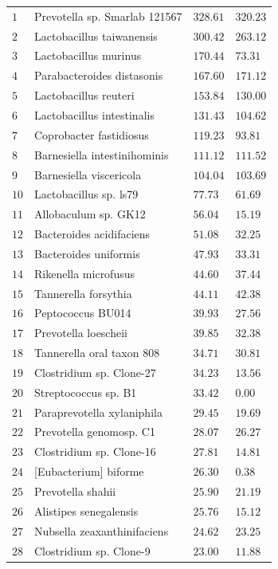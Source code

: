 \begin{center}
\begin{longtable}{|l|l|l|l|}
\hline \hline
\endlastfoot
$1$ & Prevotella sp. Smarlab 121567 & $328.61$ & $320.23$ \\
$2$ & Lactobacillus taiwanensis & $300.42$ & $263.12$ \\
$3$ & Lactobacillus murinus & $170.44$ & $73.31$ \\
$4$ & Parabacteroides distasonis & $167.60$ & $171.12$ \\
$5$ & Lactobacillus reuteri & $153.84$ & $130.00$ \\
$6$ & Lactobacillus intestinalis & $131.43$ & $104.62$ \\
$7$ & Coprobacter fastidiosus & $119.23$ & $93.81$ \\
$8$ & Barnesiella intestinihominis & $111.12$ & $111.52$ \\
$9$ & Barnesiella viscericola & $104.04$ & $103.69$ \\
$10$ & Lactobacillus sp. ls79 & $77.73$ & $61.69$ \\
$11$ & Allobaculum sp. GK12 & $56.04$ & $15.19$ \\
$12$ & Bacteroides acidifaciens & $51.08$ & $32.25$ \\
$13$ & Bacteroides uniformis & $47.93$ & $33.31$ \\
$14$ & Rikenella microfusus & $44.60$ & $37.44$ \\
$15$ & Tannerella forsythia & $44.11$ & $42.38$ \\
$16$ & Peptococcus BU014 & $39.93$ & $27.56$ \\
$17$ & Prevotella loescheii & $39.85$ & $32.38$ \\
$18$ & Tannerella oral taxon 808 & $34.71$ & $30.81$ \\
$19$ & Clostridium sp. Clone-27 & $34.23$ & $13.56$ \\
$20$ & Streptococcus sp. B1 & $33.42$ & $0.00$ \\
$21$ & Paraprevotella xylaniphila & $29.45$ & $19.69$ \\
$22$ & Prevotella genomosp. C1 & $28.07$ & $26.27$ \\
$23$ & Clostridium sp. Clone-16 & $27.81$ & $14.81$ \\
$24$ & [Eubacterium] biforme & $26.30$ & $0.38$ \\
$25$ & Prevotella shahii & $25.90$ & $21.19$ \\
$26$ & Alistipes senegalensis & $25.76$ & $15.12$ \\
$27$ & Nubsella zeaxanthinifaciens & $24.62$ & $23.25$ \\
$28$ & Clostridium sp. Clone-9 & $23.00$ & $11.88$ \\

\end{longtable}
\end{center}
